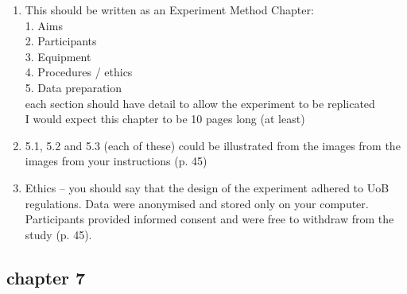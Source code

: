 \documentclass[10pt]{article}
\begin{document}
\begin{enumerate}[noitemsep,topsep=0pt]
\item This should be written as an Experiment Method Chapter: \\
	1. Aims \\
	2. Participants \\
	3. Equipment \\
	4. Procedures / ethics \\
	5. Data preparation \\
		each section should have detail
		to allow the experiment to be replicated 
		\\
	I would expect this chapter to be 10 pages long (at least)

\item 5.1, 5.2 and 5.3 (each of these) could be illustrated from the images
	from the images from your instructions (p. 45)

\item Ethics -- you should say that the design of the experiment 
	adhered to UoB regulations. 
	Data were anonymised and stored only on your computer.
	Participants provided informed consent and were free to 
	withdraw from the study	(p. 45).
	
\end{enumerate}





\subsection{chapter 7}
\end{document}
